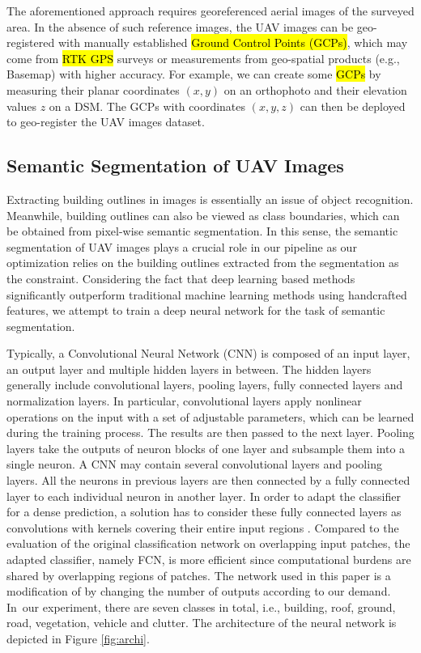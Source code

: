 The aforementioned approach requires georeferenced aerial images of the surveyed area. In the absence of such reference images, the UAV images can be geo-registered with manually established \hl{Ground Control Points (GCPs)}, %
which may come from \hl{RTK GPS} surveys 
or measurements from geo-spatial products (e.g., Basemap) with higher accuracy. For example, we can create some \hl{GCPs} %
by measuring their planar coordinates $(x,y)$ on an orthophoto and their elevation values $z$ on a DSM. The GCPs with coordinates $(x,y,z)$ can then be deployed to geo-register the UAV images dataset. 

\subsection{Semantic Segmentation of UAV Images}
Extracting building outlines in images is essentially an issue of object recognition. Meanwhile, building outlines can also be viewed as class boundaries, which can be obtained from pixel-wise semantic segmentation. In this sense, the semantic segmentation of UAV images plays a crucial role in our pipeline as our optimization relies on the building outlines extracted from the segmentation as the constraint. Considering the fact that deep learning based methods significantly outperform traditional machine learning methods using handcrafted features, we attempt to train a deep neural network for the task of semantic segmentation.

Typically, a Convolutional Neural Network (CNN) is composed of an input layer, an output layer and multiple hidden layers in between. The hidden layers generally include convolutional layers, pooling layers, fully connected layers and normalization layers. In particular, convolutional layers apply nonlinear operations on the input with a set of adjustable parameters, which can be learned during the training process. The results are then passed to the next layer. Pooling layers take the outputs of neuron blocks of one layer and subsample them into a single neuron. A CNN may contain several convolutional layers and pooling layers. All the neurons in previous layers are then connected by a fully connected layer to each individual neuron in another layer. In order to adapt the classifier for a dense prediction, a solution has to consider these fully connected layers as convolutions with kernels covering their entire input regions \cite{fcn}. Compared to the evaluation of the original classification network on overlapping input patches, the adapted classifier, namely FCN, is more efficient since computational burdens are shared by overlapping regions of patches. The network used in this paper is a modification of \cite{fcn} by changing the number of outputs according to our demand. In~our experiment, there are seven classes in total, i.e., building, roof, ground, road, vegetation, vehicle and clutter. The architecture of the neural network is depicted in Figure \ref{fig:archi}.

